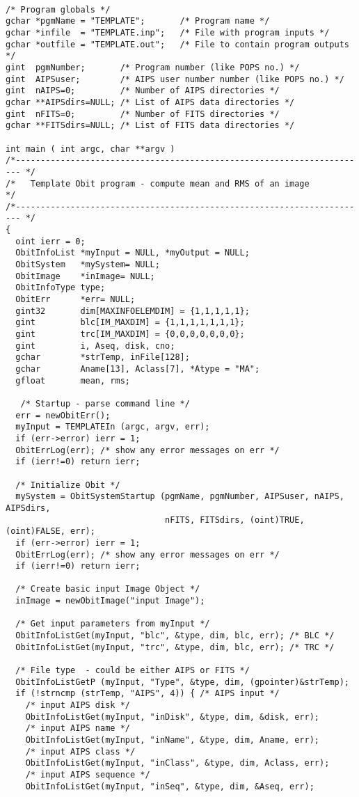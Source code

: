 \documentclass[11pt]{article}
\begin{document}
\begin{verbatim}

/* Program globals */
gchar *pgmName = "TEMPLATE";       /* Program name */
gchar *infile  = "TEMPLATE.inp";   /* File with program inputs */
gchar *outfile = "TEMPLATE.out";   /* File to contain program outputs */
gint  pgmNumber;       /* Program number (like POPS no.) */
gint  AIPSuser;        /* AIPS user number number (like POPS no.) */
gint  nAIPS=0;         /* Number of AIPS directories */
gchar **AIPSdirs=NULL; /* List of AIPS data directories */
gint  nFITS=0;         /* Number of FITS directories */
gchar **FITSdirs=NULL; /* List of FITS data directories */

int main ( int argc, char **argv )
/*----------------------------------------------------------------------- */
/*   Template Obit program - compute mean and RMS of an image             */
/*----------------------------------------------------------------------- */
{
  oint ierr = 0;
  ObitInfoList *myInput = NULL, *myOutput = NULL;
  ObitSystem   *mySystem= NULL;
  ObitImage    *inImage= NULL;
  ObitInfoType type;
  ObitErr      *err= NULL;
  gint32       dim[MAXINFOELEMDIM] = {1,1,1,1,1};
  gint         blc[IM_MAXDIM] = {1,1,1,1,1,1,1};
  gint         trc[IM_MAXDIM] = {0,0,0,0,0,0,0};
  gint         i, Aseq, disk, cno;
  gchar        *strTemp, inFile[128];
  gchar        Aname[13], Aclass[7], *Atype = "MA";
  gfloat       mean, rms;

   /* Startup - parse command line */
  err = newObitErr();
  myInput = TEMPLATEIn (argc, argv, err);
  if (err->error) ierr = 1;
  ObitErrLog(err); /* show any error messages on err */
  if (ierr!=0) return ierr;

  /* Initialize Obit */
  mySystem = ObitSystemStartup (pgmName, pgmNumber, AIPSuser, nAIPS, AIPSdirs, 
                                nFITS, FITSdirs, (oint)TRUE, (oint)FALSE, err);
  if (err->error) ierr = 1;
  ObitErrLog(err); /* show any error messages on err */
  if (ierr!=0) return ierr;

  /* Create basic input Image Object */
  inImage = newObitImage("input Image");
  
  /* Get input parameters from myInput */
  ObitInfoListGet(myInput, "blc", &type, dim, blc, err); /* BLC */
  ObitInfoListGet(myInput, "trc", &type, dim, blc, err); /* TRC */

  /* File type  - could be either AIPS or FITS */
  ObitInfoListGetP (myInput, "Type", &type, dim, (gpointer)&strTemp);
  if (!strncmp (strTemp, "AIPS", 4)) { /* AIPS input */
    /* input AIPS disk */
    ObitInfoListGet(myInput, "inDisk", &type, dim, &disk, err);
    /* input AIPS name */
    ObitInfoListGet(myInput, "inName", &type, dim, Aname, err);
    /* input AIPS class */
    ObitInfoListGet(myInput, "inClass", &type, dim, Aclass, err);
    /* input AIPS sequence */
    ObitInfoListGet(myInput, "inSeq", &type, dim, &Aseq, err);


\end{verbatim}
\end{document}
